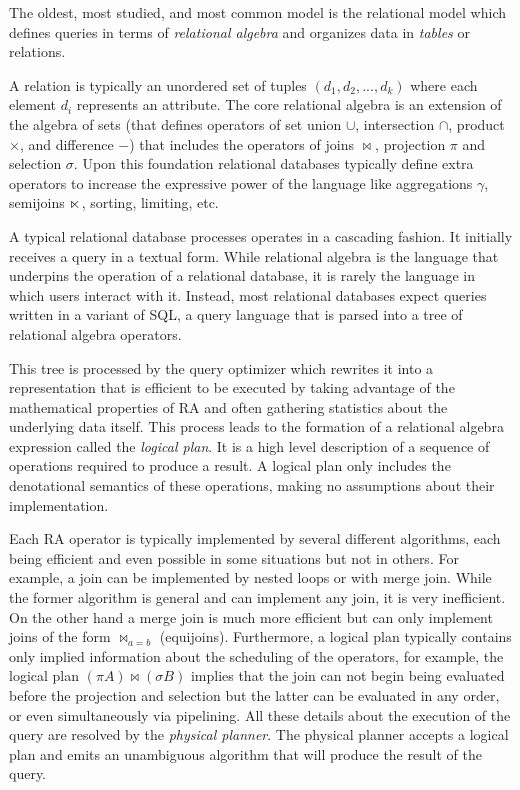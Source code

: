 The oldest, most studied, and most common model is the relational model
which defines queries in terms of \emph{relational algebra} and organizes
data in \emph{tables} or relations.

A relation is typically an unordered set of tuples
\((d_1,d_2,...,d_k)\) where each element \(d_i\) represents an
attribute. The core relational algebra is an extension of the algebra
of sets (that defines operators of set union \(\cup\), intersection
\(\cap\), product \(\times\), and difference \(-\)) that includes the
operators of joins \(\Join\), projection \(\pi\) and selection
\(\sigma\). Upon this foundation relational databases typically define
extra operators to increase the expressive power of the language like
aggregations \(\gamma\), semijoins \(\ltimes\), sorting, limiting, etc.

A typical relational database processes operates in a cascading
fashion. It initially receives a query in a textual form. While
relational algebra is the language that underpins the operation of a
relational database, it is rarely the language in which users interact
with it. Instead, most relational databases expect queries written in a
variant of SQL, a query language that is parsed into a tree of
relational algebra operators.

This tree is processed by the query optimizer which rewrites it into a
representation that is efficient to be executed by taking advantage
of the mathematical properties of RA and often gathering statistics
about the underlying data itself. This process leads to the formation
of a relational algebra expression called the \emph{logical plan}. It
is a high level description of a sequence of operations required to
produce a result. A logical plan only includes the denotational
semantics of these operations, making no assumptions about their
implementation.

Each RA operator is typically implemented by several different
algorithms, each being efficient and even possible in some situations
but not in others. For example, a join can be implemented by nested
loops or with merge join.  While the former algorithm is general and
can implement any join, it is very inefficient. On the other hand a
merge join is much more efficient but can only implement joins of the
form \(\Join_{a=b}\) (equijoins). Furthermore, a logical plan typically
contains only implied information about the scheduling of the
operators, for example, the logical plan \((\pi A) \Join (\sigma B)\)
implies that the join can not begin being evaluated before the
projection and selection but the latter can be evaluated in any
order, or even simultaneously via pipelining. All these details about
the execution of the query are resolved by the \emph{physical
  planner}. The physical planner accepts a logical plan and emits an
unambiguous algorithm that will produce the result of the query.


